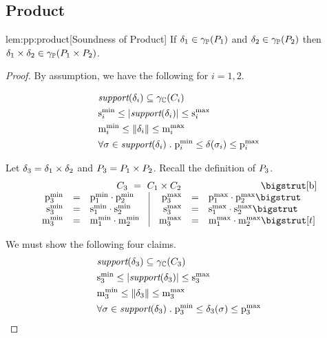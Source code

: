 \subsection{Product}
\begin{replemma}{lem:pp:product}[Soundness of Product]
If $\delta_1 \in \gamma_{\mathbb{P}}(P_{1})$ and $\delta_2 \in \gamma_{\mathbb{P}}(P_{2})$
then $\delta_1 \times \delta_2 \in \gamma_{\mathbb{P}}(P_{1} \times P_{2})$.
\end{replemma}

\begin{proof} By assumption, we have the following for $ i = 1,2 $.

\begin{align}
\label{thm:pp:prod:given1} & \support{\delta_i} \subseteq \pconc{\poly_i} \\
\label{thm:pp:prod:given2} & \smin{i} \leq \setsize{\support{\delta_i}} \leq \smax{i} \\
\label{thm:pp:prod:given3} & \mmin{i} \leq \pmass{\delta_i} \leq \mmax{i} \\
\label{thm:pp:prod:given4} & \forall \sigma \in \support{\delta_i} \;
. \; \pmin{i} \leq \delta(\sigma_i) \leq \pmax{i}
\end{align}

Let $ \delta_3 = \delta_1 \times \delta_2 $ and $ P_{3}
= P_{1} \times P_{2} $. Recall the definition of $ P_{3} $.
\[
\begin{array}{rcl@{\hspace{0.35cm}}|@{\hspace{0.35cm}}rcl}
\multicolumn{6}{c}{\poly_3\ =\ \poly_1 \pprod \poly_2} \bigstrut[b] \\
\pmin{3} &=& \pmin{1} \cdot \pmin{2} &
\pmax{3} &=& \pmax{1} \cdot \pmax{2} \bigstrut \\
\smin{3} &=& \smin{1} \cdot \smin{2} &
\smax{3} &=& \smax{1} \cdot \smax{2} \bigstrut \\
\mmin{3} &=& \mmin{1} \cdot \mmin{2} &
\mmax{3} &=& \mmax{1} \cdot \mmax{2} \bigstrut[t]
\end{array}
\]

We must show the following four claims.
\begin{align}
\label{thm:pp:prod:cond1}& \support{\delta_3} \subseteq \pconc{\poly_3} \\
\label{thm:pp:prod:cond2}& \smin{3} \leq \setsize{\support{\delta_3}} \leq \smax{3} \\
\label{thm:pp:prod:cond3}& \mmin{3} \leq \pmass{\delta_3} \leq \mmax{3} \\
\label{thm:pp:prod:cond4}& \forall \sigma \in \support{\delta_3} \;
. \; \pmin{3} \leq \delta_3(\sigma) \leq \pmax{3}
\end{align}


\end{proof}
